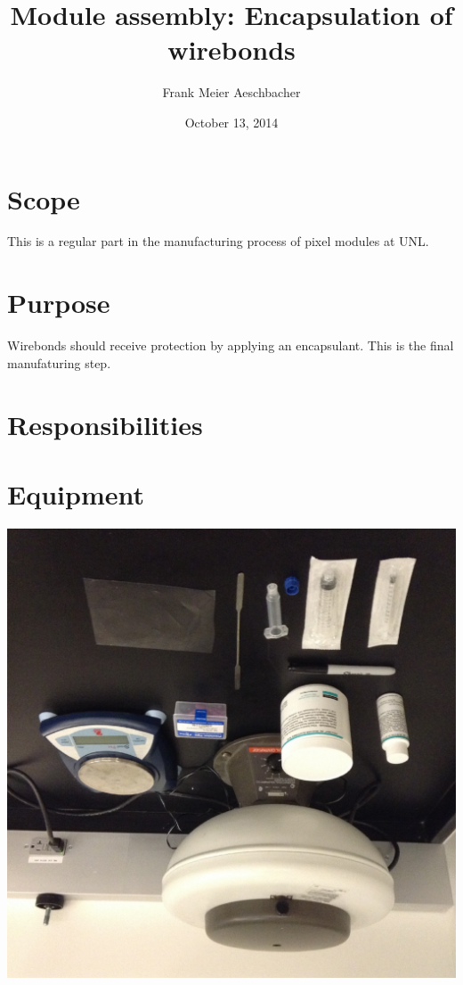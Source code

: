\documentclass[12pt]{unlsilabsop}
\title{Module assembly: Encapsulation of wirebonds}
\date{October 13, 2014}
\author{Frank Meier Aeschbacher}
\begin{document}
\maketitle

\section{Scope}
This is a regular part in the manufacturing process of pixel modules at UNL.

\section{Purpose}
Wirebonds should receive protection by applying an encapsulant. This is the final manufaturing step.


\section{Responsibilities}

\section{Equipment}
\begin{center}
\includegraphics[scale= 0.3]{img/potting_materials.pdf}
\end{center}
\end{document}
